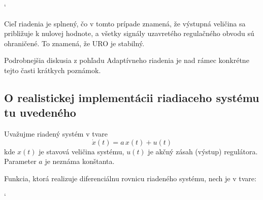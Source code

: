 \documentclass[a4paper, 10pt, ]{article}
\begin{document}
{\catcode`

}



\begin{centering}


    \vspace{-2mm}

    \figcaption{}

    \vspace{2mm}

    \label{figsc_ar02_fig01_1}

\end{centering}

\noindent
Cieľ riadenia je splnený, čo v tomto prípade znamená, že výstupná veličina sa približuje k nulovej hodnote, a všetky signály uzavretého regulačného obvodu sú ohraničené. To znamená, že URO je stabilný.

Podrobnejšia diskusia z pohľadu Adaptívneho riadenia je nad rámec konkrétne tejto časti krátkych poznámok.














\subsection{O realistickej implementácii riadiaceho systému tu uvedeného}


Uvažujme riadený systém v tvare
\begin{equation}
	\dot{x}(t) = a\, x(t) + u(t)
\end{equation}
kde $x(t)$ je stavová veličina systému, $u(t)$ je akčný zásah (výstup) regulátora. Parameter $a$ je neznáma konštanta.

Funkcia, ktorá realizuje diferenciálnu rovnicu riadeného systému, nech je v tvare:


{\catcode`

}
\end{document}
